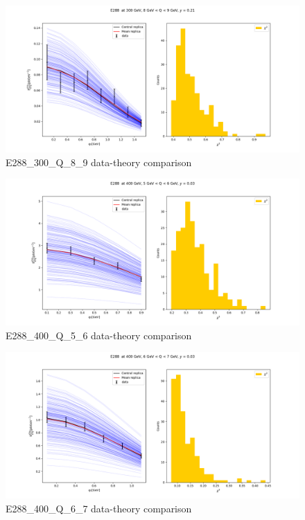 \documentclass[
]{article}
\begin{document}
\begin{figure}
\centering
\includegraphics{pngplots/E288_300_Q_8_9.png}
\caption{E288\_300\_Q\_8\_9 data-theory comparison}
\end{figure}

\begin{figure}
\centering
\includegraphics{pngplots/E288_400_Q_5_6.png}
\caption{E288\_400\_Q\_5\_6 data-theory comparison}
\end{figure}

\begin{figure}
\centering
\includegraphics{pngplots/E288_400_Q_6_7.png}
\caption{E288\_400\_Q\_6\_7 data-theory comparison}
\end{figure}
\end{document}
